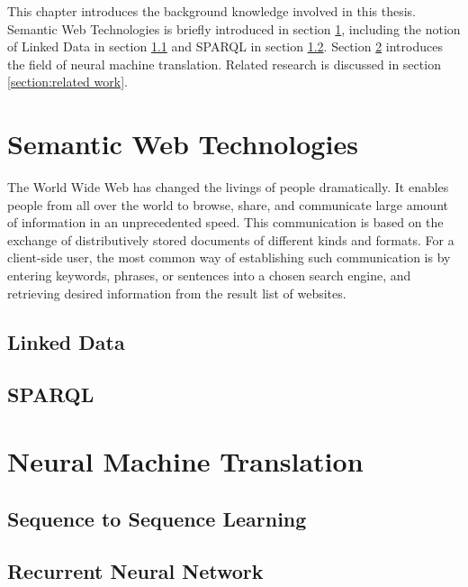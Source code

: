 
This chapter introduces the background knowledge involved in this thesis. Semantic Web Technologies is briefly introduced in section \ref{section:semantic web technologies}, including the notion of Linked Data in section \ref{subsection:linked data} and SPARQL in section \ref{subsection:sparql}. Section \ref{section:neural machine translation} introduces the field of neural machine translation. Related research is discussed in section \ref{section:related work}.

\section{Semantic Web Technologies} \label{section:semantic web technologies}

The World Wide Web has changed the livings of people dramatically. It enables people from all over the world to browse, share, and communicate large amount of information in an unprecedented speed. This communication is based on the exchange of distributively stored documents of different kinds and formats. For a client-side user, the most common way of establishing such communication is by entering keywords, phrases, or sentences into a chosen search engine, and retrieving desired information from the result list of websites. 

\subsection{Linked Data} \label{subsection:linked data}

\subsection{SPARQL} \label{subsection:sparql}


\section{Neural Machine Translation} \label{section:neural machine translation}

\subsection{Sequence to Sequence Learning}


\subsection{Recurrent Neural Network}


